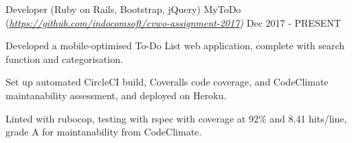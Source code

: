 

\begin{cventries}

	\cventry
		{Developer (Ruby on Rails, Bootstrap, jQuery)} %
		{MyToDo (\textmd{\em\url{https://github.com/indocomsoft/cvwo-assignment-2017})}} %
		{} %
		{Dec 2017 - PRESENT} %
		{
			\begin{cvitems} %
				\item {Developed a mobile-optimised To-Do List web application, complete with search function and categorisation.}
				\item {Set up automated CircleCI build, Coveralls code coverage, and CodeClimate maintanability assessment, and deployed on Heroku.}
				\item {Linted with rubocop, testing with rspec with coverage at 92\% and 8.41 hits/line, grade A for maintanability from CodeClimate.}
			\end{cvitems}
		}
		
    

\end{cventries}
